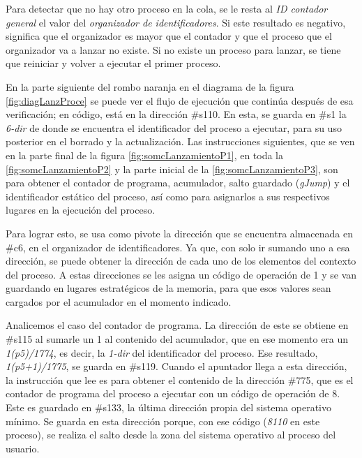 \documentclass[letterpaper,12pt,oneside]{book}
\begin{document}
        Para detectar que no hay otro proceso  en la cola, se le resta al \textit{ID contador general} el valor del \textit{organizador de 
        identificadores}. Si este 
        resultado
        es negativo, significa que el organizador es  mayor que el contador y que el proceso que el organizador va a lanzar no existe. Si no existe un 
        proceso 
        para lanzar,
        se tiene que reiniciar y volver a ejecutar el primer proceso. 
  
		En la parte siguiente del rombo naranja en el diagrama  de la figura \ref{fig:diagLanzProce}
		se puede ver el flujo de ejecución que continúa después de esa
		verificación; en código, está en la dirección \#s110. En esta, se guarda en \#s1
		la \textit{6-dir} de donde se encuentra el identificador del proceso a ejecutar, para su uso posterior en
		el borrado y la actualización. Las instrucciones siguientes, que se ven en la parte final de la figura  \ref{fig:somcLanzamientoP1},
		en toda la \ref{fig:somcLanzamientoP2} y la parte inicial de la \ref{fig:somcLanzamientoP3}, son para obtener el contador de programa, 
		acumulador, 
		salto 
		guardado (\textit{gJump}) y
		el  identificador estático del proceso, así como para asignarlos  a sus respectivos lugares en la ejecución del proceso.
  
        Para lograr esto, se usa como pivote la dirección
		que se encuentra almacenada en \#c6, en el organizador de identificadores. Ya que, con solo ir sumando uno a esa dirección, se puede obtener la dirección de 
		cada uno de los elementos
		del contexto del proceso. A estas direcciones se les asigna un código de operación de 1 y se van guardando en lugares estratégicos de
		la memoria, para que esos valores sean cargados por el acumulador en el momento indicado.
        
        Analicemos el caso del contador de programa. La dirección de este se obtiene en \#s115 al sumarle un 1 al contenido del acumulador, que en ese 
        momento era un \textit{1(p5)/1774}, es decir, la \textit{1-dir} del identificador del proceso. Ese resultado, \textit{1(p5+1)/1775},  
        se guarda en \#s119. Cuando el apuntador llega a esta dirección, la instrucción que lee es para 
        obtener el contenido de la dirección \#775, que es
		el contador de programa del proceso a ejecutar con un código de operación de 8. Este es guardado en \#s133, la última dirección
		propia del sistema operativo mínimo. Se guarda en esta dirección porque, con ese código  (\textit{8110} en este proceso), se realiza el salto 
		desde la zona del sistema operativo 
		al proceso del usuario.
		
\end{document}
